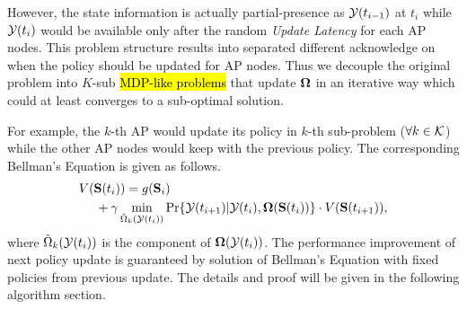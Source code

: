 However, the state information is actually partial-presence as $\mathcal{Y}(t_{i-1})$ at $t_i$ while $\mathcal{Y}(t_{i})$ would be available only after the random \emph{Update Latency} for each AP nodes.
This problem structure results into separated different acknowledge on when the policy should be updated for AP nodes. Thus we decouple the original problem into $K$-sub \hl{MDP-like problems} that update $\boldsymbol{\Omega}$ in an iterative way which could at least converges to a sub-optimal solution.
        
For example, the $k$-th AP would update its policy in $k$-th sub-problem ($\forall k\in\mathcal{K}$) while the other AP nodes would keep with the previous policy. The corresponding Bellman's Equation is given as follows.
\begin{align}
    &V(\mathbf{S}(t_{i})) = g(\mathbf{S}_{i}) 
    \nonumber\\
    &~~~~+ \gamma \min_{\tilde{\Omega}_{k}(\mathcal{Y}(t_{i}))} \Pr\{ \mathcal{Y}(t_{i+1})|\mathcal{Y}(t_{i}), \boldsymbol{\Omega}(\mathbf{S}(t_{i})) \} \cdot V(\mathbf{S}(t_{i+1})),
    \label{sp_k}
\end{align}
where $\tilde{\Omega}_{k}(\mathcal{Y}(t_{i}))$ is the component of $\boldsymbol{\Omega}(\mathcal{Y}(t_{i}))$.
The performance improvement of next policy update is guaranteed by solution of Bellman's Equation with fixed policies from previous update.
The details and proof will be given in the following algorithm section.


